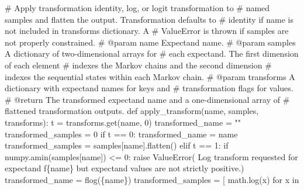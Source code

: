 \documentclass[
  letterpaper,
  DIV=11,
  numbers=noendperiod]{scrartcl}
\newenvironment{Shaded}{\begin{snugshade}}{\end{snugshade}}
\newcommand{\CommentTok}[1]{\textcolor[rgb]{0.37,0.37,0.37}{#1}}
\newcommand{\ControlFlowTok}[1]{\textcolor[rgb]{0.00,0.23,0.31}{#1}}
\newcommand{\DecValTok}[1]{\textcolor[rgb]{0.68,0.00,0.00}{#1}}
\newcommand{\KeywordTok}[1]{\textcolor[rgb]{0.00,0.23,0.31}{#1}}
\newcommand{\NormalTok}[1]{\textcolor[rgb]{0.00,0.23,0.31}{#1}}
\newcommand{\OperatorTok}[1]{\textcolor[rgb]{0.37,0.37,0.37}{#1}}
\newcommand{\PreprocessorTok}[1]{\textcolor[rgb]{0.68,0.00,0.00}{#1}}
\newcommand{\SpecialCharTok}[1]{\textcolor[rgb]{0.37,0.37,0.37}{#1}}
\newcommand{\SpecialStringTok}[1]{\textcolor[rgb]{0.13,0.47,0.30}{#1}}
\newcommand{\StringTok}[1]{\textcolor[rgb]{0.13,0.47,0.30}{#1}}
\begin{document}
\begin{Shaded}
\begin{Highlighting}[]
\CommentTok{\# Apply transformation identity, log, or logit transformation to}
\CommentTok{\# named samples and flatten the output.  Transformation defaults to }
\CommentTok{\# identity if name is not included in \textasciigrave{}transforms\textasciigrave{} dictionary.  A }
\CommentTok{\# ValueError is thrown if samples are not properly constrained.}
\CommentTok{\# @param name Expectand name.}
\CommentTok{\# @param samples A dictionary of two{-}dimensional arrays for}
\CommentTok{\#                each expectand.  The first dimension of each element }
\CommentTok{\#                indexes the Markov chains and the second dimension }
\CommentTok{\#                indexes the sequential states within each Markov chain.}
\CommentTok{\# @param transforms A dictionary with expectand names for keys and}
\CommentTok{\#                   transformation flags for values.}
\CommentTok{\# @return The transformed expectand name and a one{-}dimensional array of}
\CommentTok{\#         flattened transformation outputs.}
\KeywordTok{def}\NormalTok{ apply\_transform(name, samples, transforms):}
\NormalTok{  t }\OperatorTok{=}\NormalTok{ transforms.get(name, }\DecValTok{0}\NormalTok{)}
\NormalTok{  transformed\_name }\OperatorTok{=} \StringTok{""}
\NormalTok{  transformed\_samples }\OperatorTok{=} \DecValTok{0}
  \ControlFlowTok{if}\NormalTok{ t }\OperatorTok{==} \DecValTok{0}\NormalTok{:}
\NormalTok{    transformed\_name }\OperatorTok{=}\NormalTok{ name}
\NormalTok{    transformed\_samples }\OperatorTok{=}\NormalTok{ samples[name].flatten()}
  \ControlFlowTok{elif}\NormalTok{ t }\OperatorTok{==} \DecValTok{1}\NormalTok{:}
    \ControlFlowTok{if}\NormalTok{ numpy.amin(samples[name]) }\OperatorTok{\textless{}=} \DecValTok{0}\NormalTok{:}
      \ControlFlowTok{raise} \PreprocessorTok{ValueError}\NormalTok{( }\StringTok{\textquotesingle{}Log transform requested for expectand \textquotesingle{}}
                       \SpecialStringTok{f\textquotesingle{}}\SpecialCharTok{\{}\NormalTok{name}\SpecialCharTok{\}}\SpecialStringTok{ but expectand values are not strictly \textquotesingle{}} 
                        \StringTok{\textquotesingle{}positive.\textquotesingle{}}\NormalTok{)}
\NormalTok{    transformed\_name }\OperatorTok{=} \SpecialStringTok{f\textquotesingle{}log(}\SpecialCharTok{\{}\NormalTok{name}\SpecialCharTok{\}}\SpecialStringTok{)\textquotesingle{}}
\NormalTok{    transformed\_samples }\OperatorTok{=}\NormalTok{ [ math.log(x) }\ControlFlowTok{for}\NormalTok{ x }\KeywordTok{in} 

\end{Highlighting}
\end{Shaded}
\end{document}
